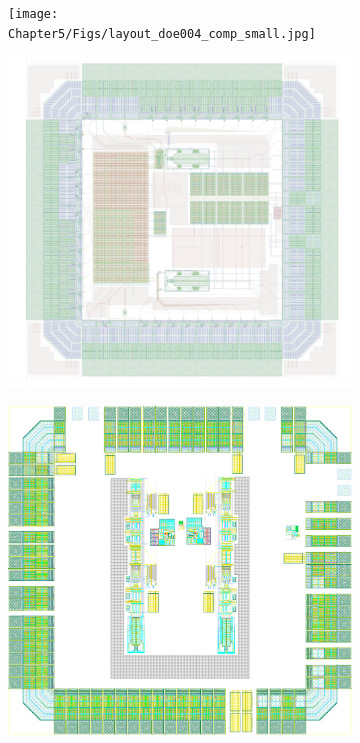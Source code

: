 \begin{figure}[htp]
    \centering
    \begin{subfigure}[b]{0.33\textwidth}
        \texttt{[image: Chapter5/Figs/layout\_doe004\_comp\_small.jpg]}
    \end{subfigure}
    \begin{subfigure}[b]{0.33\textwidth}
        \includegraphics[width=\textwidth]{Chapter5/Figs/layout_doe005_sar_small.jpg}
    \end{subfigure}
    \begin{subfigure}[b]{0.33\textwidth}
        \includegraphics[width=\textwidth]{Chapter5/Figs/layout_adc_small.png}

\end{subfigure}
\end{figure}
